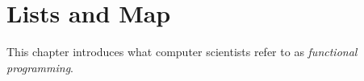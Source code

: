 \chapter{Lists and Map}
\label{chap:ListsMap}
This chapter introduces what computer scientists refer to as \emph{functional programming}. 
